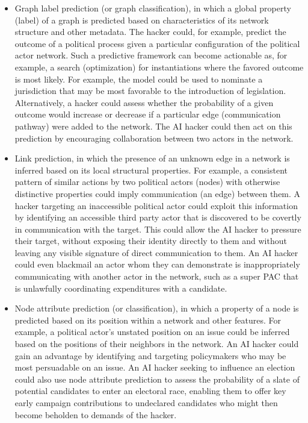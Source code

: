 \documentclass[nonacm,12pt]{acmart}
\begin{document}
\begin{itemize}
\item Graph label prediction (or graph classification), in which a global property (label) of a graph is predicted based on characteristics of its network structure and other metadata.  
The hacker could, for example, predict the outcome of a political process given a particular configuration of the political actor network.  
Such a predictive framework can become actionable as, for example, a search (optimization) for instantiations where the favored outcome is most likely.
For example, the model could be used to nominate a jurisdiction that may be most favorable to the introduction of legislation. 
Alternatively, a hacker could assess whether the probability of a given outcome would increase or decrease if a particular edge (communication pathway) were added to the network.  
The AI hacker could then act on this prediction by encouraging collaboration between two actors in the network.


\item Link prediction, in which the presence of an unknown edge in a network is inferred based on its local structural properties.  For example, a consistent pattern of similar actions by two political actors (nodes) with otherwise distinctive properties could imply communication (an edge) between them. A hacker targeting an inaccessible political actor could exploit this information by identifying an accessible third party actor that is discovered to be covertly in communication with the target. This could allow the AI hacker to pressure their target, without exposing their identity directly to them and without leaving any visible signature of direct communication to them.  An AI hacker could even blackmail an actor whom they can demonstrate is inappropriately communicating with another actor in the network, such as a super PAC that is unlawfully coordinating expenditures with a candidate.

\item Node attribute prediction (or classification), in which a property of a node is predicted based on its position within a network and other features.  
For example, a political actor's unstated position on an issue could be inferred based on the positions of their neighbors in the network.  
An AI hacker could gain an advantage by identifying and targeting policymakers who may be most persuadable on an issue.  
An AI hacker seeking to influence an election could also use node attribute prediction to assess the probability of a slate of potential candidates to enter an electoral race, enabling them to offer key early campaign contributions to undeclared candidates who might then become beholden to demands of the hacker.


\end{itemize}
\end{document}
